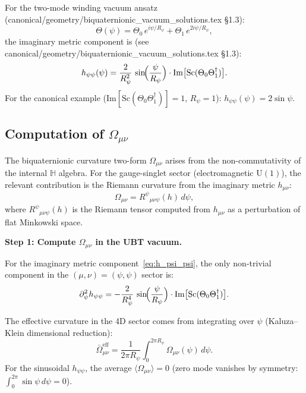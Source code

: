 \documentclass[11pt,a4paper]{article}
\theoremstyle{remark}
\begin{document}
For the two-mode winding vacuum ansatz
(canonical/geometry/biquaternionic\_vacuum\_solutions.tex \S1.3):
\begin{equation}
  \Theta(\psi) = \Theta_0\,e^{i\psi/R_\psi} + \Theta_1\,e^{2i\psi/R_\psi},
  \label{eq:two_mode_ansatz}
\end{equation}
the imaginary metric component is (see canonical/geometry/biquaternionic\_vacuum\_solutions.tex \S1.3):
\begin{equation}
  h_{\psi\psi}(\psi) = \frac{2}{R_\psi^2}\,\sin\!\Bigl(\frac{\psi}{R_\psi}\Bigr)\cdot
    \mathrm{Im}\bigl[\mathrm{Sc}(\Theta_0 \Theta_1^\dagger)\bigr].
  \label{eq:h_psi_psi}
\end{equation}
For the canonical example ($\mathrm{Im}[\mathrm{Sc}(\Theta_0\Theta_1^\dagger)] = 1$,
$R_\psi = 1$): $h_{\psi\psi}(\psi) = 2\sin\psi$.

\subsection{Computation of \texorpdfstring{$\Omega_{\mu\nu}$}{Omega\_munu}}

The biquaternionic curvature two-form $\Omega_{\mu\nu}$ arises from the non-commutativity of
the internal $\mathbb{H}$ algebra. For the gauge-singlet sector (electromagnetic $\mathrm{U}(1)$),
the relevant contribution is the Riemann curvature from the imaginary metric $h_{\mu\nu}$:
\begin{equation}
  \Omega_{\mu\nu} = R^\psi{}_{\mu\nu\psi}(h)\,d\psi,
  \label{eq:Omega_def}
\end{equation}
where $R^\psi{}_{\mu\nu\psi}(h)$ is the Riemann tensor computed from $h_{\mu\nu}$ as a
perturbation of flat Minkowski space.

\textbf{Step 1: Compute $\Omega_{\mu\nu}$ in the UBT vacuum.}

For the imaginary metric component~\eqref{eq:h_psi_psi}, the only non-trivial component in
the $(\mu,\nu) = (\psi,\psi)$ sector is:
\begin{equation}
  \partial_\psi^2 h_{\psi\psi} = -\frac{2}{R_\psi^4}\,\sin\!\Bigl(\frac{\psi}{R_\psi}\Bigr)
    \cdot \mathrm{Im}\bigl[\mathrm{Sc}(\Theta_0\Theta_1^\dagger)\bigr].
  \label{eq:d2h}
\end{equation}

The effective curvature in the 4D sector comes from integrating over $\psi$ (Kaluza--Klein
dimensional reduction):
\begin{equation}
  \bar{\Omega}_{\mu\nu}^{\mathrm{eff}} = \frac{1}{2\pi R_\psi}\int_0^{2\pi R_\psi}
    \Omega_{\mu\nu}(\psi)\,d\psi.
  \label{eq:Omega_effective}
\end{equation}
For the sinusoidal $h_{\psi\psi}$, the average $\langle \Omega_{\mu\nu} \rangle = 0$
(zero mode vanishes by symmetry: $\int_0^{2\pi} \sin\psi\,d\psi = 0$).
\end{document}
